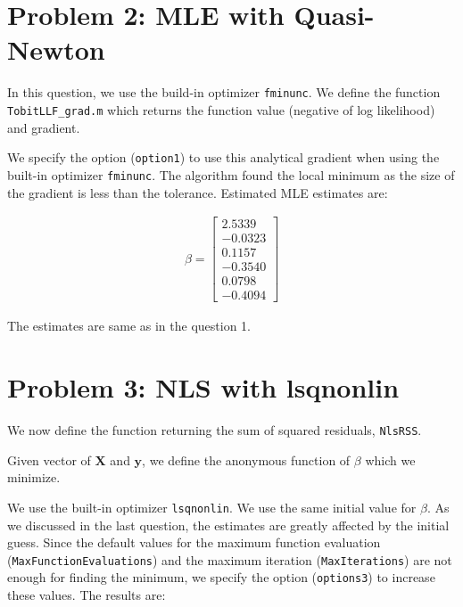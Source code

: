 \documentclass[11pt,letter]{article}
\newcommand{\vect}[1]{\boldsymbol{\mathbf{#1}}}
\newcounter{lem}[section] \setcounter{lem}{0}
\newcommand{\lprn}[1]{\left[{#1}\right]}
\newcommand{\code}[1]{\texttt{#1}}
\begin{document}
\section*{Problem 2: MLE with Quasi-Newton}

In this question, we use the build-in optimizer \code{fminunc}. We define the function \code{TobitLLF\_grad.m} which returns the function value (negative of log likelihood) and gradient. 



We specify the option (\code{option1}) to use this analytical gradient when using the built-in optimizer \code{fminunc}. The algorithm found the local minimum as the size of the gradient is less than the tolerance. Estimated MLE estimates are:

\begin{align*}
\beta = \lprn{
\begin{array}{r}
 2.5339 \\
-0.0323\\
0.1157\\
-0.3540\\
0.0798\\
-0.4094
\end{array}
}
\end{align*}

The estimates are same as in the question 1.

\section*{Problem 3: NLS with lsqnonlin}

We now define the function returning the sum of squared residuals, \code{NlsRSS}.




Given vector of $\vect{X}$ and $\vect{y}$, we define the anonymous function of $\beta$ which we minimize. 




We use the built-in optimizer \code{lsqnonlin}. We use the same initial value for $\beta$. As we discussed in the last question, the estimates are greatly affected by the initial guess. Since the default values for the maximum function evaluation (\code{MaxFunctionEvaluations}) and the maximum iteration (\code{MaxIterations}) are not enough for finding the minimum, we specify the option (\code{options3}) to increase these values. The results are:
\end{document}
